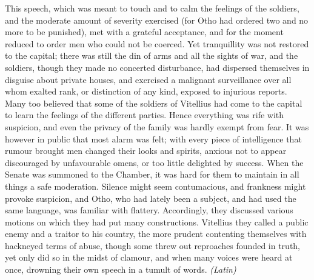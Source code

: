 This speech, which was meant to touch and to calm the feelings of the soldiers, and the moderate amount of severity exercised (for Otho had ordered two and no more to be punished), met with a grateful acceptance, and for the moment reduced to order men who could not be coerced. Yet tranquillity was not restored to the capital; there was still the din of arms and all the sights of war, and the soldiers, though they made no concerted disturbance, had dispersed themselves in disguise about private houses, and exercised a malignant surveillance over all whom exalted rank, or distinction of any kind, exposed to injurious reports. Many too believed that some of the soldiers of Vitellius had come to the capital to learn the feelings of the different parties. Hence everything was rife with suspicion, and even the privacy of the family was hardly exempt from fear. It was however in public that most alarm was felt; with every piece of intelligence that rumour brought men changed their looks and spirits, anxious not to appear discouraged by unfavourable omens, or too little delighted by success. When the Senate was summoned to the Chamber, it was hard for them to maintain in all things a safe moderation. Silence might seem contumacious, and frankness might provoke suspicion, and Otho, who had lately been a subject, and had used the same language, was familiar with flattery. Accordingly, they discussed various motions on which they had put many constructions. Vitellius they called a public enemy and a traitor to his country, the more prudent contenting themselves with hackneyed terms of abuse, though some threw out reproaches founded in truth, yet only did so in the midst of clamour, and when many voices were heard at once, drowning their own speech in a tumult of words. \emph{(Latin)}


